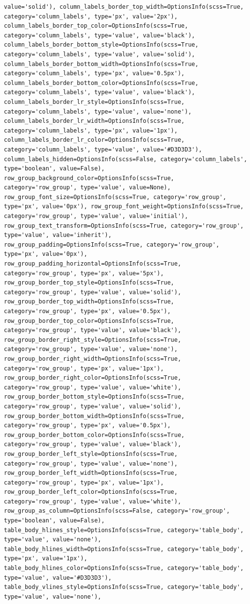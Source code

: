 \documentclass[
  letterpaper,
  DIV=11,
  numbers=noendperiod]{scrreprt}
\newcounter{none} %
\begin{document}
\begin{verbatim}
value='solid'), column_labels_border_top_width=OptionsInfo(scss=True, category='column_labels', type='px', value='2px'), column_labels_border_top_color=OptionsInfo(scss=True, category='column_labels', type='value', value='black'), column_labels_border_bottom_style=OptionsInfo(scss=True, category='column_labels', type='value', value='solid'), column_labels_border_bottom_width=OptionsInfo(scss=True, category='column_labels', type='px', value='0.5px'), column_labels_border_bottom_color=OptionsInfo(scss=True, category='column_labels', type='value', value='black'), column_labels_border_lr_style=OptionsInfo(scss=True, category='column_labels', type='value', value='none'), column_labels_border_lr_width=OptionsInfo(scss=True, category='column_labels', type='px', value='1px'), column_labels_border_lr_color=OptionsInfo(scss=True, category='column_labels', type='value', value='#D3D3D3'), column_labels_hidden=OptionsInfo(scss=False, category='column_labels', type='boolean', value=False), row_group_background_color=OptionsInfo(scss=True, category='row_group', type='value', value=None), row_group_font_size=OptionsInfo(scss=True, category='row_group', type='px', value='0px'), row_group_font_weight=OptionsInfo(scss=True, category='row_group', type='value', value='initial'), row_group_text_transform=OptionsInfo(scss=True, category='row_group', type='value', value='inherit'), row_group_padding=OptionsInfo(scss=True, category='row_group', type='px', value='0px'), row_group_padding_horizontal=OptionsInfo(scss=True, category='row_group', type='px', value='5px'), row_group_border_top_style=OptionsInfo(scss=True, category='row_group', type='value', value='solid'), row_group_border_top_width=OptionsInfo(scss=True, category='row_group', type='px', value='0.5px'), row_group_border_top_color=OptionsInfo(scss=True, category='row_group', type='value', value='black'), row_group_border_right_style=OptionsInfo(scss=True, category='row_group', type='value', value='none'), row_group_border_right_width=OptionsInfo(scss=True, category='row_group', type='px', value='1px'), row_group_border_right_color=OptionsInfo(scss=True, category='row_group', type='value', value='white'), row_group_border_bottom_style=OptionsInfo(scss=True, category='row_group', type='value', value='solid'), row_group_border_bottom_width=OptionsInfo(scss=True, category='row_group', type='px', value='0.5px'), row_group_border_bottom_color=OptionsInfo(scss=True, category='row_group', type='value', value='black'), row_group_border_left_style=OptionsInfo(scss=True, category='row_group', type='value', value='none'), row_group_border_left_width=OptionsInfo(scss=True, category='row_group', type='px', value='1px'), row_group_border_left_color=OptionsInfo(scss=True, category='row_group', type='value', value='white'), row_group_as_column=OptionsInfo(scss=False, category='row_group', type='boolean', value=False), table_body_hlines_style=OptionsInfo(scss=True, category='table_body', type='value', value='none'), table_body_hlines_width=OptionsInfo(scss=True, category='table_body', type='px', value='1px'), table_body_hlines_color=OptionsInfo(scss=True, category='table_body', type='value', value='#D3D3D3'), table_body_vlines_style=OptionsInfo(scss=True, category='table_body', type='value', value='none'), 
\end{verbatim}
\end{document}
